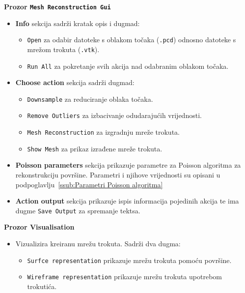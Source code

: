 \textbf{Prozor \texttt{Mesh Reconstruction Gui}} 
\begin{itemize}
    \item \textbf{Info} sekcija sadrži kratak opis i dugmad:
        \begin{itemize}
            \item \texttt{Open} za odabir datoteke s oblakom točaka
                (\texttt{.pcd}) odnosno datoteke s mrežom trokuta
                (\texttt{.vtk}).
            \item \texttt{Run All} za pokretanje svih akcija nad
                odabranim oblakom točaka.
        \end{itemize}
    \item \textbf{Choose action} sekcija sadrži dugmad:
        \begin{itemize}
            \item \texttt{Downsample} za reduciranje oblaka točaka.
            \item \texttt{Remove Outliers} za izbacivanje odudarajućih
                vrijednosti.
            \item \texttt{Mesh Reconstruction} za izgradnju mreže
                trokuta.
            \item \texttt{Show Mesh} za prikaz izrađene mreže trokuta.
        \end{itemize}
    \item \textbf{Poisson parameters} sekcija prikazuje parametre za
        Poisson algoritma za rekonstrukciju površine. Parametri i
        njihove vrijednosti su opisani u
        podpoglavlju~\ref{ssub:Parametri Poisson algoritma}
    \item \textbf{Action output} sekcija prikazuje ispis informacija
        pojedinih akcija te ima dugme \texttt{Save Output} za spremanje
        tektsa.
\end{itemize}
\textbf{Prozor Visualisation} 
\begin{itemize}
    \item Vizualizira kreiranu mrežu trokuta. Sadrži dva dugma:
        \begin{itemize}
            \item \texttt{Surfce representation} prikazuje mrežu trokuta
                pomoću površine.
            \item \texttt{Wireframe representation} prikazuje mrežu
                trokuta upotrebom trokutića.
        \end{itemize}
\end{itemize}

